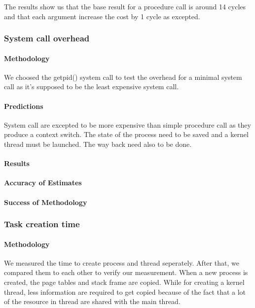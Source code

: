 The results show us that the base result for a procedure call is around 14
cycles and that each argument increase the cost by 1 cycle as excepted.

\subsubsection{System call overhead}
\paragraph{Methodology}
We choosed the getpid() system call to test the overhead for a minimal system
call as it's supposed to be the least expensive system call.

\paragraph{Predictions}
System call are excepted to be more expensive than simple procedure call as they
produce a context switch.
The state of the process need to be saved and a kernel thread must be launched.
The way back need also to be done.

\paragraph{Results}











\paragraph{Accuracy of Estimates}
\paragraph{Success of Methodology}



\subsubsection{Task creation time}
\paragraph{Methodology}
We measured the time to create process and thread seperately. After that, we compared them to each other to verify our measurement. When a new process is created, the page tables and stack frame are copied. While for creating a kernel thread, less information are required to get copied because of the fact that a lot of the resource in thread are shared with the main thread. 

